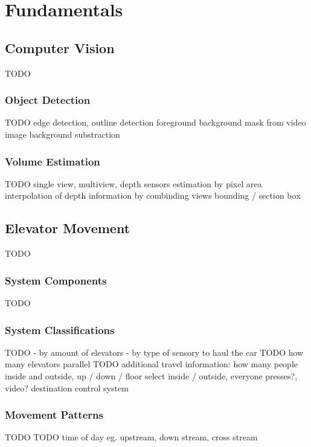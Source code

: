 \chapter{Fundamentals}
\label{chap:sota}

\section{Computer Vision}

TODO

\subsection{Object Detection}

TODO
edge detection, outline detection
foreground background mask from video image
background substraction

\subsection{Volume Estimation}

TODO
single view, multiview, depth sensors
estimation by pixel area
interpolation of depth information by combinding views
bounding / section box

\section{Elevator Movement}
TODO

\subsection{System Components}
TODO

\subsection{System Classifications}
TODO
- by amount of elevators
- by type of sensory to haul the car
TODO how many elevators parallel
TODO additional travel information: how many people inside and outside, up / down / floor select inside / outside, everyone presses?, video? 
destination control system

\subsection{Movement Patterns}
TODO
TODO time of day eg. upstream, down stream, cross stream

